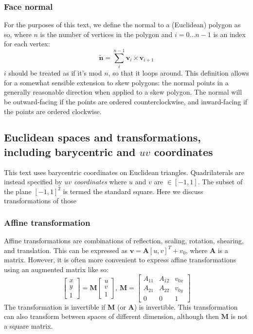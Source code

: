\documentclass{amsart}[12pt]
\begin{document}
\subsubsection{Face normal}
For the purposes of this text, we define the normal to a (Euclidean) polygon as
so, where $n$ is the number of vertices in the polygon and
$i = 0 \dots n-1$ is an index for each vertex:
\begin{equation}
  \mathbf{\widetilde{n}} =
  \sum^{n-1}_i \mathbf{v}_i \times \mathbf{v}_{i+1}
\end{equation}
$i$ should be treated as if it's mod $n$, so that it loops around.
This definition allows for a somewhat sensible extension to skew polygons:
the normal points in a generally reasonable direction when applied to a skew
polygon. The normal will be outward-facing if the points are ordered
counterclockwise, and inward-facing if the points are ordered clockwise.

\subsection{Euclidean spaces and transformations, including barycentric and $uv$ coordinates}
This text uses barycentric coordinates on Euclidean triangles.
Quadrilaterals are instead specified by \textit{$uv$ coordinates} where
$u$ and $v$ are $\in [-1, 1]$. The subset of the plane $[-1, 1]^2$ is termed
the standard square. Here we discuss transformations of those

\subsubsection{Affine transformation}
Affine transformations are combinations of reflection, scaling, rotation,
shearing, and translation. This can be expressed as $\mathbf v = \mathbf A [u,
v]^T + v_0$, where $\mathbf A$ is a matrix. However, it is often more
convenient to express affine transformations using an augmented matrix like so:
\begin{equation}
  \begin{bmatrix}  x \\  y \\  1 \end{bmatrix}
   = \mathbf M
    \begin{bmatrix}  u \\  v \\  1 \end{bmatrix},\,
    \mathbf M = \begin{bmatrix}
       A_{11} & A_{12} & v_{0x} \\
       A_{21} & A_{22} & v_{0y} \\
       0 & 0 & 1
       \end{bmatrix}
\end{equation}
The transformation is invertible if $\mathbf M$ (or $\mathbf A$) is
invertible. This transformation can also transform between spaces of different
dimension, although then $\mathbf M$ is not a square matrix.
\end{document}
